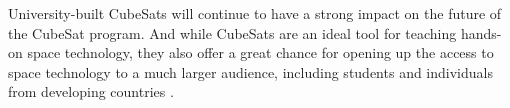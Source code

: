 University-built CubeSats will continue to have a strong impact on the future of the CubeSat program. And while CubeSats are an ideal tool for teaching hands-on space technology, they also offer a great chance for opening up the access to space technology to a much larger audience, including students and individuals from developing countries \cite{scholz2015toward}. 

